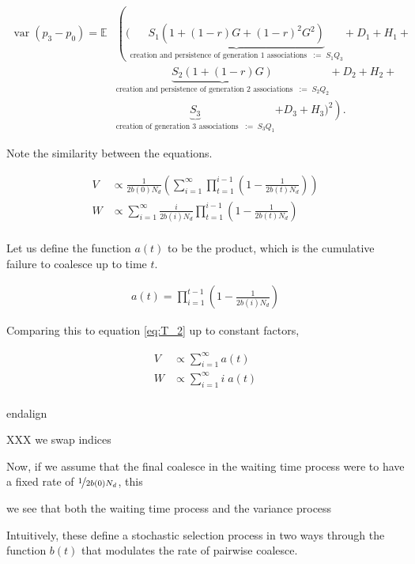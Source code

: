 \documentclass[11pt]{article}
\newcommand{\E}{\mathbb{E}}
\DeclareMathOperator{\var}{var}
\begin{document}
\begin{align}
  \var(p_3 - p_0) = \E & \left( \bigg( \underbrace{S_1(1 + (1-r) G + (1-r)^2 G^2)}_{\text{creation and persistence of generation 1 associations} \;\; := \; S_1 Q_3} \right. +  D_1 + H_1+ \nonumber \\
                       & \underbrace{S_2(1 + (1-r) G)}_{\text{creation and persistence of generation 2 associations} \;\; := \; S_2 Q_2}+ D_2 + H_2 + \nonumber \\
                       &  \underbrace{S_3}_{\text{creation of generation 3 associations} \;\; := \; S_3 Q_1  }\left. + D_3 + H_3 \bigg)^2 \right). &
    \label{eq:scr-var2}
\end{align}
%

Note the similarity between the equations.

\begin{align}
  V &\propto \frac{1}{2b(0)N_d}\left(\sum_{i=1}^\infty \prod_{t=1}^{i-1} \left(1 - \frac{1}{2b(t)N_d}\right) \right) \\
  W &\propto \sum_{i=1}^\infty \frac{i}{2 b(i) N_d} \prod_{t=1}^{i-1} \left(1-\frac{1}{2 b(t) N_d}\right) \\
\end{align}


Let us define the function $a(t)$ to be the product, which is the cumulative
failure to coalesce up to time $t$.

\begin{align}
  a(t) = \prod_{i=1}^{t-1} \left( 1-\frac{1}{2 b(i) N_d} \right)
\end{align}

Comparing this to equation \eqref{eq:T_2} up to constant factors, 

\begin{align}
  V &\propto \sum_{i=1}^\infty a(t) \\
  W &\propto \sum_{i=1}^\infty i \; a(t) \\
\end{align}

end{align}

XXX we swap indices

Now, if we assume that the final coalesce in the waiting time process were to
have a fixed rate of $\nicefrac{1}{2b(0)N_d}$, this 

we see that both the waiting time process and the variance process 

Intuitively, these define a stochastic selection process in two ways through
the function $b(t)$ that modulates the rate of pairwise coalesce. 
\end{document}
